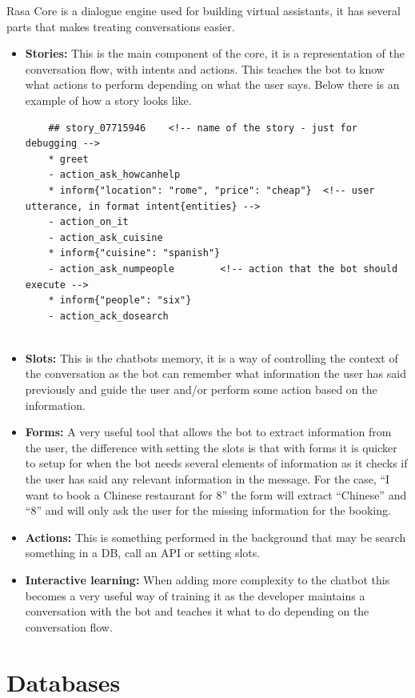 Rasa Core is a dialogue engine used for building virtual assistants, it has several parts that makes treating conversations easier.
\begin{itemize}
	\item {\textbf{Stories:} This is the main component of the core, it is a representation of the conversation flow, with intents and actions. This teaches the bot to know what actions to perform depending on what the user says. Below there is an example of how a story looks like.
	\begin{lstlisting}
	## story_07715946    <!-- name of the story - just for debugging -->
	* greet
	- action_ask_howcanhelp
	* inform{"location": "rome", "price": "cheap"}  <!-- user utterance, in format intent{entities} -->
	- action_on_it
	- action_ask_cuisine
	* inform{"cuisine": "spanish"}
	- action_ask_numpeople        <!-- action that the bot should execute -->
	* inform{"people": "six"}
	- action_ack_dosearch
	
	\end{lstlisting}
	}
	\item {\textbf{Slots:} This is the chatbots memory, it is a way of controlling the context of the conversation as the bot can remember what information the user has said previously and guide the user and/or perform some action based on the information.}
	\item {\textbf{Forms:} A very useful tool that allows the bot to extract information from the user, the difference with setting the slots is that with forms it is quicker to setup for when the bot needs several elements of information as it checks if the user has said any relevant information in the message. For the case, “I want to book a Chinese restaurant for 8” the form will extract “Chinese” and “8” and will only ask the user for the missing information for the booking.}
	\item {\textbf{Actions:} This is something performed in the background that may be search something in a DB, call an API or setting slots.}
	\item {\textbf{Interactive learning:} When adding more complexity to the chatbot this becomes a very useful way of training it as the developer maintains a conversation with the bot and teaches it what to do depending on the conversation flow.}
\end{itemize}

\section{Databases}\label{sec:chap3_db}

